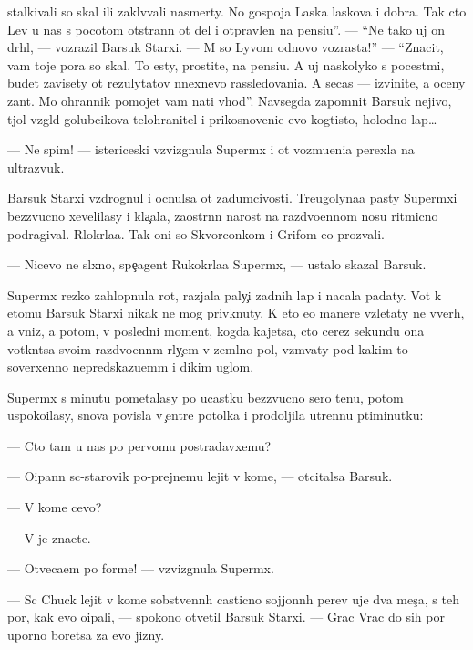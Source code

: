 \documentclass[12pt]{book}
\begin{document}
stalkivali so skal{\yi} ili zakl{\e}v{\yi}vali nasmerty. No gospoja Laska laskova i dobra. Tak cto Lev u nas s pocotom otstran{\e}n ot del i otpravlen na pensi{\y}u''. — ``Ne tako{\y} uj on dr{\ia}hl{\yi}{\y}, — vozrazil Barsuk Starxi{\y}. — M{\yi} so Lyvom odnovo vozrasta!'' — ``Znacit, vam toje pora so skal{\yi}. To {\y}esty, prostite, na pensi{\y}u. A uj naskolyko s pocest{\ia}mi, budet zavisety ot rezulytatov n{\yi}nexnevo rassledovani{\y}a. A se{\y}cas — izvinite, {\y}a oceny zan{\ia}t. Mo{\y} ohrannik pomojet vam na{\y}ti v{\yi}hod''. Navsegda zapomnit Barsuk nejivo{\y}, t{\ia}jol{\yi}{\y} vzgl{\ia}d golubcikova telohranitel{\ia} i prikosnoveni{\y}e {\y}evo kogtisto{\y}, holodno{\y} lap{\yi}…

— Ne spim! — istericeski vzvizgnula Superm{\yi}x i ot vozmu{\x}eni{\y}a perexla na ultrazvuk.

Barsuk Starxi{\y} vzdrognul i ocnulsa ot zadumcivosti. Treugolyna{\y}a pasty Superm{\yi}xi bezzvucno xevelilasy i kla{\c}ala, zaostr{\e}nn{\yi}{\y} narost na razdvo{\y}ennom nosu ritmicno podragival. R{\yi}lokr{\yi}la{\y}a. Tak oni so Skvorconkom i Grifom {\y}e{\y}o prozvali.

— Nicevo ne sl{\yi}xno, spe{\c}agent Rukokr{\yi}la{\y}a Superm{\yi}x, — ustalo skazal Barsuk.

Superm{\yi}x rezko zahlopnula rot, razjala paly{\c}i zadnih lap i nacala padaty. Vot k etomu Barsuk Starxi{\y} nikak ne mog priv{\yi}knuty. K eto{\y} {\y}e{\y}o manere vzletaty ne vverh, a vniz, a potom, v posledni{\y} moment, kogda kajetsa, cto cerez sekundu ona votkn{\e}tsa svo{\y}im razdvo{\y}enn{\yi}m r{\yi}ly{\c}em v zeml{\ia}no{\y} pol, vzm{\yi}vaty pod kakim-to soverxenno nepredskazu{\y}em{\yi}m i dikim uglom.

Superm{\yi}x s minutu pometalasy po ucastku bezzvucno{\y} sero{\y} ten{\y}u, potom uspoko{\y}ilasy, snova povisla v {\c}entre potolka i prodoljila utrenn{\io}{\y}u p{\ia}\-ti\-mi\-nut\-ku:

— Cto tam u nas po pervomu postradavxemu?

— O{\x}ipann{\yi}{\y} s{\yi}c-star{\y}ov{\x}ik po-prejnemu lejit v kome, — otcitalsa Barsuk.

— V kome cevo?

— V{\yi} je zna{\y}ete.

— Otveca{\y}em po forme! — vzvizgnula Superm{\yi}x.

— S{\yi}c Chuck lejit v kome sobstvenn{\yi}h casticno sojjonn{\yi}h per{\y}ev uje dva mes{\ia}{\c}a, s teh por, kak {\y}evo o{\x}ipali, — spo\-ko{\y}\-no otvetil Barsuk Starxi{\y}. — Grac Vrac do sih por uporno boretsa za {\y}evo jizny.
\end{document}
